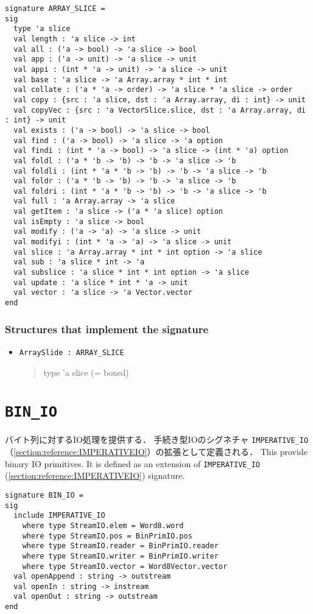 \documentclass{jbook}
\newcommand{\txt}[2]{#2}
\newcommand{\code}[1]{\mbox{\large\tt #1}}
\newenvironment{program}{\begin{quote}\begin{tt}}%
                        {\end{tt}\end{quote}}
\newcommand{\signature}[2]{
\section{{\tt #1}}\label{section:reference:#2}
}
\newcommand{\sigref}[1]{\ref{section:reference:#1}}
\newcommand{\Structure}{\subsubsection*{\txt{シグネチャを実装するストラクチャ}{Structures that implement the signature}}}
\begin{document}
\begin{verbatim}
signature ARRAY_SLICE =
sig
  type 'a slice
  val length : 'a slice -> int
  val all : ('a -> bool) -> 'a slice -> bool
  val app : ('a -> unit) -> 'a slice -> unit
  val appi : (int * 'a -> unit) -> 'a slice -> unit
  val base : 'a slice -> 'a Array.array * int * int
  val collate : ('a * 'a -> order) -> 'a slice * 'a slice -> order
  val copy : {src : 'a slice, dst : 'a Array.array, di : int} -> unit
  val copyVec : {src : 'a VectorSlice.slice, dst : 'a Array.array, di : int} -> unit
  val exists : ('a -> bool) -> 'a slice -> bool
  val find : ('a -> bool) -> 'a slice -> 'a option
  val findi : (int * 'a -> bool) -> 'a slice -> (int * 'a) option
  val foldl : ('a * 'b -> 'b) -> 'b -> 'a slice -> 'b
  val foldli : (int * 'a * 'b -> 'b) -> 'b -> 'a slice -> 'b
  val foldr : ('a * 'b -> 'b) -> 'b -> 'a slice -> 'b
  val foldri : (int * 'a * 'b -> 'b) -> 'b -> 'a slice -> 'b
  val full : 'a Array.array -> 'a slice
  val getItem : 'a slice -> ('a * 'a slice) option
  val isEmpty : 'a slice -> bool
  val modify : ('a -> 'a) -> 'a slice -> unit
  val modifyi : (int * 'a -> 'a) -> 'a slice -> unit
  val slice : 'a Array.array * int * int option -> 'a slice
  val sub : 'a slice * int -> 'a
  val subslice : 'a slice * int * int option -> 'a slice
  val update : 'a slice * int * 'a -> unit
  val vector : 'a slice -> 'a Vector.vector
end
\end{verbatim}

\Structure
\begin{itemize}
\item \code{ArraySlide : ARRAY\_SLICE}
\begin{program}
    type 'a slice (= boxed)
\end{program}
\end{itemize}

\signature{BIN\_IO}{BINIO}
\ifjp%
	バイト列に対するIO処理を提供する．
	手続き型IOのシグネチャ
\code{IMPERATIVE\_IO}（\sigref{IMPERATIVEIO}）の拡張として定義される．
\else%
	This provide binary IO primitives.
	It is defined as an extension of \code{IMPERATIVE\_IO}
(\sigref{IMPERATIVEIO}) signature.
\fi%

\begin{verbatim}
signature BIN_IO =
sig
  include IMPERATIVE_IO
    where type StreamIO.elem = Word8.word
    where type StreamIO.pos = BinPrimIO.pos
    where type StreamIO.reader = BinPrimIO.reader
    where type StreamIO.writer = BinPrimIO.writer
    where type StreamIO.vector = Word8Vector.vector
  val openAppend : string -> outstream
  val openIn : string -> instream
  val openOut : string -> outstream
end
\end{verbatim}
\end{document}
